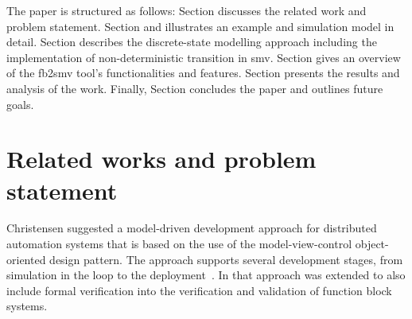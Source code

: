 \begin{bibunit}

The paper is structured as follows: Section  discusses the related work and problem statement. Section  and  illustrates an example and  simulation model in detail. Section   describes the discrete-state modelling approach including the implementation of non-deterministic transition in smv. Section   gives an overview of the fb2smv tool's functionalities and features. Section   presents the results and analysis of the work. Finally, Section  concludes the paper and outlines future goals.


\section{Related works and problem statement}

Christensen suggested a model-driven development approach \cite{christensen2000design} for distributed automation systems that is based on the use of the model-view-control object-oriented design pattern. The approach supports several development stages, from simulation in the loop to the deployment~\cite{patil2018adapting}. 
In \cite{vyatkin2008closed} that approach was extended to also include formal verification into the verification and validation of function block systems.


\end{bibunit}
